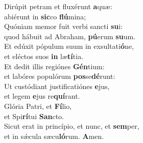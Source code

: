 \evenverse Dirúpit petram et fluxérunt \textbf{a}quæ:~\*\\
\evenverse abiérunt in \textbf{sic}co \textbf{flú}mina;\\
\oddverse Quóniam memor fuit verbi sancti \textbf{su}i:~\*\\
\oddverse quod hábuit ad Abraham, \textbf{pú}erum \textbf{su}um.\\
\evenverse Et edúxit pópulum suum in exsultati\textbf{ó}ne,~\*\\
\evenverse et eléctos suos \textbf{in} læ\textbf{tí}tia.\\
\oddverse Et dedit illis regiónes \textbf{Gén}tium:~\*\\
\oddverse et labóres populórum \textbf{pos}se\textbf{dé}runt:\\
\evenverse Ut custódiant justificatiónes \textbf{e}jus,~\*\\
\evenverse et legem \textbf{e}jus re\textbf{quí}rant.\\
\oddverse Glória Patri, et \textbf{Fí}lio,~\*\\
\oddverse et Spi\textbf{rí}tui \textbf{San}cto.\\
\evenverse Sicut erat in princípio, et nunc, et \textbf{sem}per,~\*\\
\evenverse et in sǽcula sæcu\textbf{ló}rum. \textbf{A}men.\\
